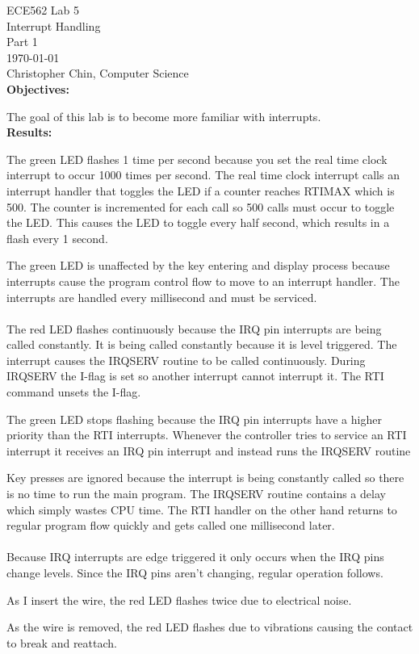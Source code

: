 \documentclass[11pt,a4paper]{article}
\begin{document}
{\parindent0pt
ECE562 Lab 5\\
Interrupt Handling\\
Part 1\\
\today\\
Christopher Chin, Computer Science\\

\textbf{Objectives:}

The goal of this lab is to become more familiar with interrupts.\\

\textbf{Results:}

The green LED flashes 1 time per second because you set the real time clock interrupt to occur 1000 times per second.
The real time clock interrupt calls an interrupt handler that toggles the LED if a counter reaches RTIMAX which is 500.
The counter is incremented for each call so 500 calls must occur to toggle the LED.
This causes the LED to toggle every half second, which results in a flash every 1 second.

The green LED is unaffected by the key entering and display process because interrupts cause the program control flow to move to an interrupt handler.
The interrupts are handled every millisecond and must be serviced.
\\~\\
The red LED flashes continuously because the IRQ pin interrupts are being called constantly.
It is being called constantly because it is level triggered.
The interrupt causes the IRQSERV routine to be called continuously.
During IRQSERV the I-flag is set so another interrupt cannot interrupt it.
The RTI command unsets the I-flag.

The green LED stops flashing because the IRQ pin interrupts have a higher priority than the RTI interrupts.
Whenever the controller tries to service an RTI interrupt it receives an IRQ pin interrupt and instead runs the IRQSERV routine

Key presses are ignored because the interrupt is being constantly called so there is no time to run the main program.
The IRQSERV routine contains a delay which simply wastes CPU time.
The RTI handler on the other hand returns to regular program flow quickly and gets called one millisecond later.
\\~\\
Because IRQ interrupts are edge triggered it only occurs when the IRQ pins change levels.
Since the IRQ pins aren't changing, regular operation follows.

As I insert the wire, the red LED flashes twice due to electrical noise.

As the wire is removed, the red LED flashes due to vibrations causing the contact to break and reattach.
}
\end{document}
